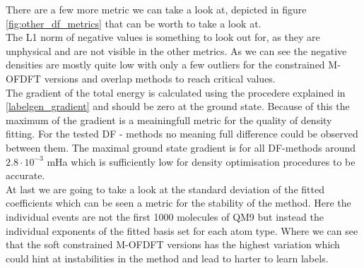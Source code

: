 There are a few more metric we can take a look at, depicted in figure \ref{fig:other_df_metrics} that can be worth to take a look at. \\
The L1 norm of negative values is something to look out for, as they are unphysical and are not visible in the other metrics. As we can see the negative densities are mostly quite low with only a few outliers for the constrained M-OFDFT versions and overlap methods to reach critical values.\\
The gradient of the total energy is calculated using the procedere explained in \ref{labelgen_gradient} and should be zero at the ground state. Because of this the maximum of the gradient is a meainingfull metric for the quality of density fitting. For the tested DF - methods no meaning full difference could be observed between them. The maximal ground state gradient is for all DF-methods around $2.8\cdot 10^{-3}$ mHa which is sufficiently low for density optimisation procedures to be accurate.\\
At last we are going to take a look at the standard deviation of the fitted coefficients which can be seen a metric for the stability of the method. Here the individual events are not the first 1000 molecules of QM9 but instead the individual exponents of the fitted basis set for each atom type. Where we can see that the soft constrained M-OFDFT versions has the highest variation which could hint at instabilities in the method and lead to harter to learn labels. \\
